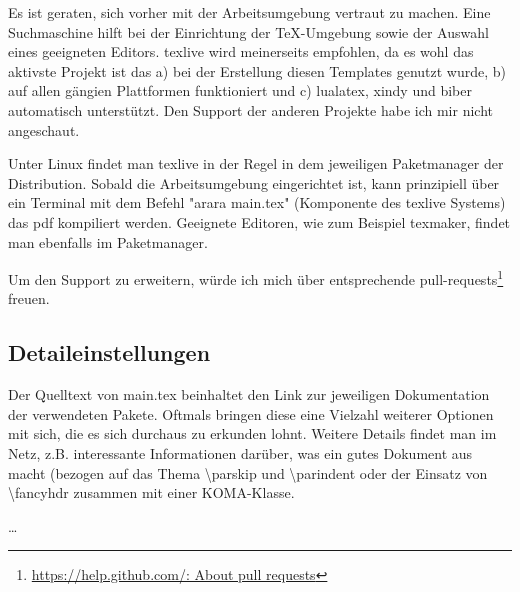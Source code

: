Es ist geraten, sich vorher mit der Arbeitsumgebung vertraut zu machen. Eine Suchmaschine hilft bei der Einrichtung der TeX-Umgebung sowie der Auswahl eines geeigneten Editors. texlive wird meinerseits empfohlen, da es wohl das aktivste Projekt ist das a) bei der Erstellung diesen Templates genutzt wurde, b) auf allen gängien Plattformen funktioniert und c) lualatex, xindy und biber automatisch unterstützt. Den Support der anderen Projekte habe ich mir nicht angeschaut.

Unter Linux findet man texlive in der Regel in dem jeweiligen Paketmanager der Distribution. Sobald die Arbeitsumgebung eingerichtet ist, kann prinzipiell über ein Terminal mit dem Befehl "arara main.tex" (Komponente des texlive Systems) das pdf kompiliert werden.
Geeignete Editoren, wie zum Beispiel texmaker, findet man ebenfalls im Paketmanager.

Um den Support zu erweitern, würde ich mich über entsprechende pull-requests\footnote{\href{https://help.github.com/en/articles/about-pull-requests}{https://help.github.com/: About pull requests}} freuen.

\subsection{Detaileinstellungen}
Der Quelltext von main.tex beinhaltet den Link zur jeweiligen Dokumentation der verwendeten Pakete. Oftmals bringen diese eine Vielzahl weiterer Optionen mit sich, die es sich durchaus zu erkunden lohnt.
Weitere Details findet man im Netz, z.B.  interessante Informationen darüber, was ein gutes Dokument aus macht (bezogen auf das Thema \textbackslash parskip und \textbackslash parindent oder der Einsatz von \textbackslash fancyhdr zusammen mit einer KOMA-Klasse.

\dots
